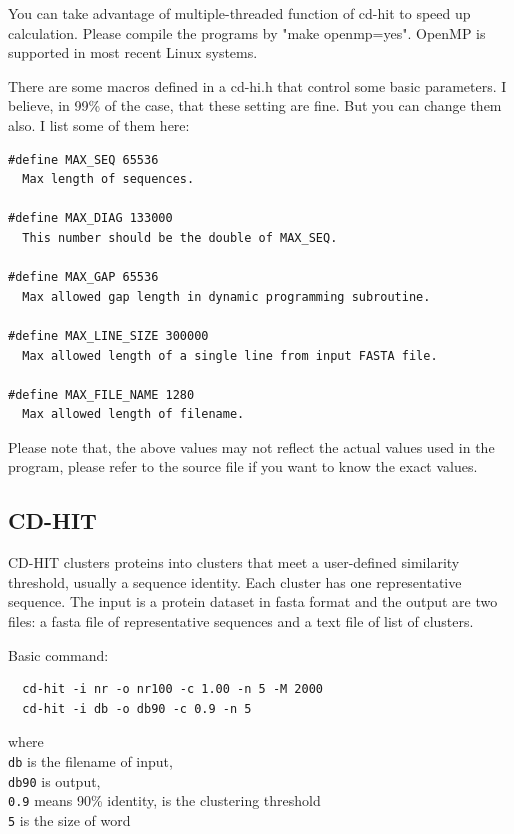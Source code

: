 \documentclass[12pt,a4paper]{article}
\begin{document}
You can take advantage of multiple-threaded function of cd-hit to speed up calculation. Please compile the programs by "make openmp=yes". OpenMP is supported in most recent Linux systems.

There are some macros defined in a cd-hi.h that control some basic parameters. I believe, in 99\% of the case, that these setting are fine. But you can change them also. I list some of them here:

\begin{lstlisting}
#define MAX_SEQ 65536
  Max length of sequences.
  
#define MAX_DIAG 133000
  This number should be the double of MAX_SEQ.

#define MAX_GAP 65536
  Max allowed gap length in dynamic programming subroutine.

#define MAX_LINE_SIZE 300000
  Max allowed length of a single line from input FASTA file.

#define MAX_FILE_NAME 1280
  Max allowed length of filename.
\end{lstlisting}

Please note that, the above values may not reflect the actual values used in the program, please refer to the source file if you want to know the exact values.

  

\subsection{CD-HIT }

CD-HIT clusters proteins into clusters that meet a user-defined similarity threshold, usually a sequence identity. Each cluster has one representative sequence. The input is a protein dataset in fasta format and the output are two files: a fasta file of representative sequences and a text file of list of clusters.

Basic command:

\begin{lstlisting}
  cd-hit -i nr -o nr100 -c 1.00 -n 5 -M 2000
  cd-hit -i db -o db90 -c 0.9 -n 5
\end{lstlisting}
where\\
\texttt{db} is the filename of input,\\
\texttt{db90} is output,\\
\texttt{0.9} means 90\% identity, is the clustering threshold\\
\texttt{5} is the size of word\\
\end{document}
